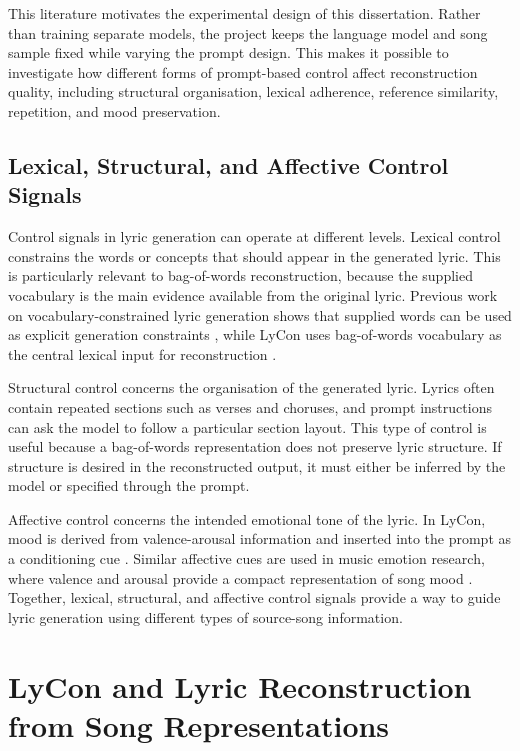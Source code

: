 This literature motivates the experimental design of this dissertation. Rather than training separate models, the project keeps the language model and song sample fixed while varying the prompt design. This makes it possible to investigate how different forms of prompt-based control affect reconstruction quality, including structural organisation, lexical adherence, reference similarity, repetition, and mood preservation.

\subsection{Lexical, Structural, and Affective Control Signals}

Control signals in lyric generation can operate at different levels. Lexical control constrains the words or concepts that should appear in the generated lyric. This is particularly relevant to bag-of-words reconstruction, because the supplied vocabulary is the main evidence available from the original lyric. Previous work on vocabulary-constrained lyric generation shows that supplied words can be used as explicit generation constraints \cite{ma2021ailyricist}, while LyCon uses bag-of-words vocabulary as the central lexical input for reconstruction \cite{kim2024lycon}.

Structural control concerns the organisation of the generated lyric. Lyrics often contain repeated sections such as verses and choruses, and prompt instructions can ask the model to follow a particular section layout. This type of control is useful because a bag-of-words representation does not preserve lyric structure. If structure is desired in the reconstructed output, it must either be inferred by the model or specified through the prompt.

Affective control concerns the intended emotional tone of the lyric. In LyCon, mood is derived from valence-arousal information and inserted into the prompt as a conditioning cue \cite{kim2024lycon}. Similar affective cues are used in music emotion research, where valence and arousal provide a compact representation of song mood \cite{delbouys2018musicmood}. Together, lexical, structural, and affective control signals provide a way to guide lyric generation using different types of source-song information.

\section{LyCon and Lyric Reconstruction from Song Representations}

